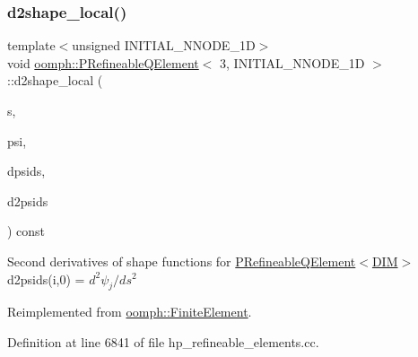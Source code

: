 \subsubsection{\texorpdfstring{d2shape\+\_\+local()}{d2shape\_local()}}
{\footnotesize\ttfamily template$<$unsigned I\+N\+I\+T\+I\+A\+L\+\_\+\+N\+N\+O\+D\+E\+\_\+1D$>$ \\
void \hyperlink{classoomph_1_1PRefineableQElement}{oomph\+::\+P\+Refineable\+Q\+Element}$<$ 3, I\+N\+I\+T\+I\+A\+L\+\_\+\+N\+N\+O\+D\+E\+\_\+1D $>$\+::d2shape\+\_\+local (\begin{DoxyParamCaption}\item[{const \hyperlink{classoomph_1_1Vector}{Vector}$<$ double $>$ \&}]{s,  }\item[{\hyperlink{classoomph_1_1Shape}{Shape} \&}]{psi,  }\item[{\hyperlink{classoomph_1_1DShape}{D\+Shape} \&}]{dpsids,  }\item[{\hyperlink{classoomph_1_1DShape}{D\+Shape} \&}]{d2psids }\end{DoxyParamCaption}) const\hspace{0.3cm}{\ttfamily [virtual]}}

Second derivatives of shape functions for \hyperlink{classoomph_1_1PRefineableQElement}{P\+Refineable\+Q\+Element$<$\+D\+I\+M$>$} d2psids(i,0) = $ d^2 \psi_j / d s^2 $ 

Reimplemented from \hyperlink{classoomph_1_1FiniteElement_a53e5051582d9da07b9d35da9debd0cd7}{oomph\+::\+Finite\+Element}.



Definition at line 6841 of file hp\+\_\+refineable\+\_\+elements.\+cc.

\mbox{\label{classoomph_1_1PRefineableQElement_3_013_00_01INITIAL__NNODE__1D_01_4_adfa591eb8f4ebd20615713d1e721aa7f}} 
